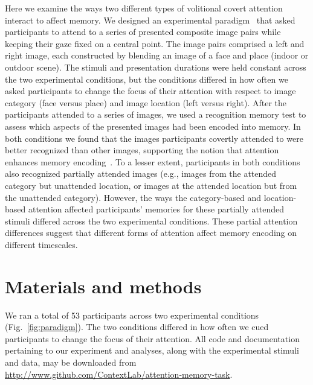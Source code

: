 \documentclass[english]{article}
\begin{document}
Here we examine the ways two different types of volitional covert attention
interact to affect memory. We designed an experimental
paradigm~\citep[following][]{Posn80} that asked participants to attend to a
series of presented composite image pairs while keeping their gaze fixed on a
central point. The image pairs comprised a left and right image, each
constructed by blending an image of a face and place (indoor or outdoor scene).
The stimuli and presentation durations were held constant across the two
experimental conditions, but the conditions differed in how often we asked
participants to change the focus of their attention with respect to image
category (face versus place) and image location (left versus right). After the
participants attended to a series of images, we used a recognition memory test
to assess which aspects of the presented images had been encoded into memory.
In both conditions we found that the images participants covertly attended to
were better recognized than other images, supporting the notion that attention
enhances memory encoding~\citep[i.e., they rated attended images as more
familiar than unattended images;][]{Yone02}. To a lesser extent, participants
in both conditions also recognized partially attended images (e.g., images from
the attended category but unattended location, or images at the attended
location but from the unattended category). However, the ways the
category-based and location-based attention affected participants' memories for
these partially attended stimuli differed across the two experimental conditions.
These partial attention differences suggest that different forms of attention
affect memory encoding on different timescales.

\section*{Materials and methods}

We ran a total of 53 participants across two experimental conditions
(Fig.~\ref{fig:paradigm}). The two conditions differed in how often we cued
participants to change the focus of their attention. All code and documentation
pertaining to our experiment and analyses, along with the experimental stimuli
and data, may be downloaded from
\url{http://www.github.com/ContextLab/attention-memory-task}.
\end{document}
